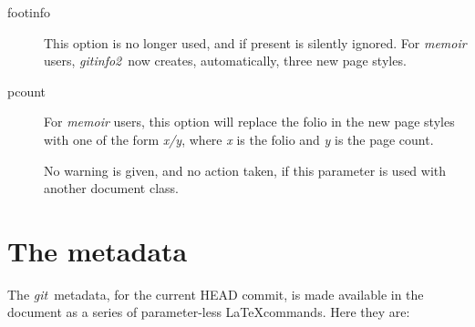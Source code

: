 \documentclass[a4paper,12pt,twoside,openany]{memoir}
\newcommand{\sfit}[1]{\textit{#1}}
\newcommand{\git}{\sfit{git}}
\newcommand{\tpname}{\sfit{gitinfo2}}
\begin{document}
\begin{description}

\item[footinfo]
This option is no longer used, and if present is silently ignored.
For \sfit{memoir} users, \tpname\ now creates, automatically,
three new page styles.

\item[pcount]
For \sfit{memoir} users, this option will replace the folio
in the new page styles with one of the form \textit{x/y},
where \textit{x} is the folio and \textit{y} is the page count.

No warning is given, and no action taken,
if this parameter is used with another document class.

\end{description}
\clearpage
\section{The metadata}
The \git\ metadata, for the current HEAD commit,
is made available in the document
as a series of parameter-less \LaTeX commands.
Here they are:
\end{document}
